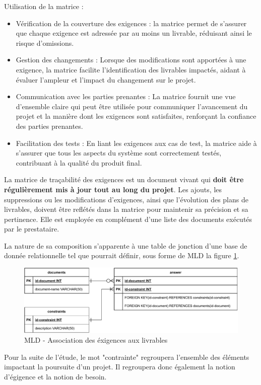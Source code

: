 \documentclass[a4paper,12pt]{article}
\begin{document}
Utilisation de la matrice :
\begin{itemize}
\item Vérification de la couverture des exigences : la matrice permet de s'assurer que chaque exigence est adressée par au moins un livrable, réduisant ainsi le risque d'omissions.
\item Gestion des changements : Lorsque des modifications sont apportées à une exigence, la matrice facilite l'identification des livrables impactés, aidant à évaluer l'ampleur et l'impact du changement sur le projet.
\item Communication avec les parties prenantes : La matrice fournit une vue d'ensemble claire qui peut être utilisée pour communiquer l'avancement du projet et la manière dont les exigences sont satisfaites, renforçant la confiance des parties prenantes.
\item Facilitation des tests : En liant les exigences aux cas de test, la matrice aide à s'assurer que tous les aspects du système sont correctement testés, contribuant à la qualité du produit final.
\end{itemize}

La matrice de traçabilité des exigences est un document vivant qui \textbf{doit être régulièrement mis à jour tout au long du projet}. Les ajouts, les suppressions ou les modifications d'exigences, ainsi que l'évolution des plans de livrables, doivent être reflétés dans la matrice pour maintenir sa précision et sa pertinence.
Elle est employée en complément d'une liste des documents exécutés par le prestataire.

La nature de sa composition s'apparente à une table de jonction d'une base de donnée relationnelle tel que pourrait définir, sous forme de MLD la figure \ref{fig:org94e9a3d}.

\begin{figure}[htbp]
\centering
\includegraphics[width=.9\linewidth]{./svg/db-exigences-lde.pdf}
\caption{\label{fig:org94e9a3d}MLD - Association des éxigences aux livrables}
\end{figure}

Pour la suite de l'étude, le mot "contrainte" regroupera l'ensemble des éléments impactant la poursuite d'un projet. Il regroupera donc également la notion d'égigence et la notion de besoin.
\end{document}
